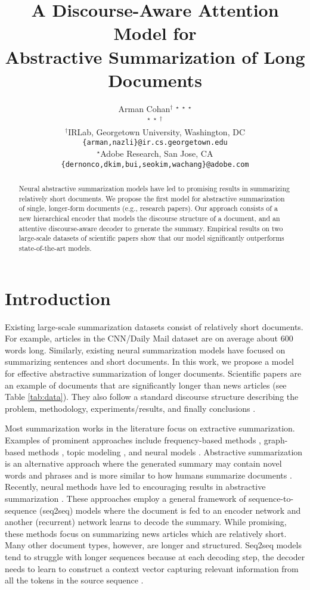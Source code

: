 \documentclass[11pt,a4paper]{article}
\title{A Discourse-Aware Attention Model for \\Abstractive Summarization of Long Documents}
\author{
  {Arman Cohan}$^\dagger$
  \quad {Franck Dernoncourt}$^\star$
  \quad {Doo Soon Kim}$^\star$
  \quad {Trung Bui}$^\star$ \\
  \quad {\textbf{Seokhwan Kim}}$^\star$
  \quad {\textbf{Walter Chang}}$^\star$
  \quad {\textbf{Nazli Goharian}}$^\dagger$ \vspace{6pt} \\
$^\dagger$IRLab, Georgetown University, Washington, DC \\
  {\small \tt \{arman,nazli\}@ir.cs.georgetown.edu} \vspace{4pt}\\
  $^\star$Adobe Research, San Jose, CA\\
  {\small \tt \{dernonco,dkim,bui,seokim,wachang\}@adobe.com}
  }
\date{}
\begin{document}
\maketitle
\begin{abstract}
Neural abstractive summarization models have led to promising results in summarizing relatively short documents. We propose the first model for abstractive summarization of single, longer-form documents (e.g., research papers). Our approach consists of a new hierarchical encoder that models the discourse structure of a document, and an attentive discourse-aware decoder to generate the summary.
Empirical results on two large-scale datasets of scientific papers show that our model significantly outperforms state-of-the-art models.
\end{abstract}

\section{Introduction}

Existing large-scale summarization datasets consist of relatively short documents. For example, articles in the CNN/Daily Mail dataset \cite{hermann2015teaching} are on average about 600 words long. Similarly, existing neural summarization models have focused on summarizing sentences and short documents.
In this work, we propose a model for effective abstractive summarization of longer documents.
Scientific papers are an example of documents that are significantly longer than news articles (see Table \ref{tab:data}). They also follow a standard discourse structure describing the problem, methodology, experiments/results, and finally conclusions \cite{Suppe1998-SUPTSO}.


Most summarization works in the literature focus on extractive summarization. Examples of prominent approaches include frequency-based methods \cite{vanderwende2007beyond}, graph-based methods \cite{erkan2004lexrank}, topic modeling \cite{steinberger2004using}, and neural models \cite{nallapati2017summarunner}. Abstractive summarization is an alternative approach where the generated summary may contain novel words and phrases and is more similar to how humans summarize documents \cite{jing2002using}. Recently, neural methods have led to encouraging results in abstractive summarization \cite{nallapati2016abstractive,see2017get,paulus2017deep,li2017cascaded}. These approaches employ a general framework of sequence-to-sequence (seq2seq) models \cite{sutskever2014sequence} where the document is fed to an encoder network and another (recurrent) network learns to decode the summary. While promising, these methods focus on summarizing news articles which are relatively short. Many other document types, however, are longer and structured. Seq2seq models tend to struggle with longer sequences because at each decoding step, the decoder needs to learn to construct a context vector capturing relevant information from all the tokens in the source sequence \cite{shao2017generating}.
\end{document}
